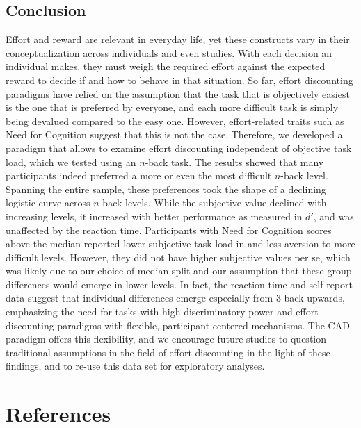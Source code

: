 \documentclass[
  man,floatsintext]{apa6}
\begin{document}
\hypertarget{conclusion}{%
\subsection{Conclusion}\label{conclusion}}

Effort and reward are relevant in everyday life, yet these constructs vary in their conceptualization across individuals and even studies.
With each decision an individual makes, they must weigh the required effort against the expected reward to decide if and how to behave in that situation.
So far, effort discounting paradigms have relied on the assumption that the task that is objectively easiest is the one that is preferred by everyone, and each more difficult task is simply being devalued compared to the easy one.
However, effort-related traits such as Need for Cognition suggest that this is not the case.
Therefore, we developed a paradigm that allows to examine effort discounting independent of objective task load, which we tested using an \(n\)-back task.
The results showed that many participants indeed preferred a more or even the most difficult \(n\)-back level.
Spanning the entire sample, these preferences took the shape of a declining logistic curve across \(n\)-back levels.
While the subjective value declined with increasing levels, it increased with better performance as measured in \(d'\), and was unaffected by the reaction time.
Participants with Need for Cognition scores above the median reported lower subjective task load in and less aversion to more difficult levels.
However, they did not have higher subjective values per se, which was likely due to our choice of median split and our assumption that these group differences would emerge in lower levels.
In fact, the reaction time and self-report data suggest that individual differences emerge especially from 3-back upwards, emphasizing the need for tasks with high discriminatory power and effort discounting paradigms with flexible, participant-centered mechanisms.
The CAD paradigm offers this flexibility, and we encourage future studies to question traditional assumptions in the field of effort discounting in the light of these findings, and to re-use this data set for exploratory analyses.

\newpage

\hypertarget{references}{%
\section{References}\label{references}}
\end{document}

